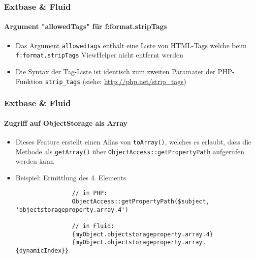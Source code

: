 
\begin{frame}[fragile]
	\frametitle{Extbase \& Fluid}
	\framesubtitle{Argument "allowedTags" für f:format.stripTags}

	\begin{itemize}

		\item Das Argument \texttt{allowedTags} enthält eine Liste von HTML-Tags
			welche beim \texttt{f:format.stripTags} ViewHelper nicht entfernt werden

		\item Die Syntax der Tag-Liste ist identisch zum zweiten Paramater der PHP-Funktion
			\texttt{strip\_tags} (siehe: \url{http://php.net/strip_tags})

	\end{itemize}

\end{frame}


\begin{frame}[fragile]
	\frametitle{Extbase \& Fluid}
	\framesubtitle{Zugriff auf ObjectStorage als Array}

	\lstset{basicstyle=\tiny\ttfamily}

	\begin{itemize}

		\item Dieses Feature erstellt einen Alias von \texttt{toArray()}, welches es erlaubt, dass die Methode als \texttt{getArray()} über \texttt{ObjectAccess::getPropertyPath} aufgerufen werden kann

		\item Beispiel: Ermittlung des 4. Elements

			\begin{lstlisting}
				// in PHP:
				ObjectAccess::getPropertyPath($subject, 'objectstorageproperty.array.4')

				// in Fluid:
				{myObject.objectstorageproperty.array.4}
				{myObject.objectstorageproperty.array.{dynamicIndex}}
			\end{lstlisting}

	\end{itemize}

\end{frame}

